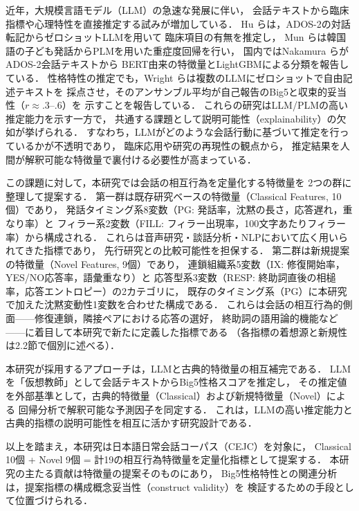 \documentclass[dvipdfmx,11pt,a4paper]{bxjsarticle}
\renewcommand{\_}{\paperorigunderscore\allowbreak}%
\begin{document}
近年，大規模言語モデル（LLM）の急速な発展に伴い，
会話テキストから臨床指標や心理特性を直接推定する試みが増加している．
Hu ら\cite{hu2025}は，ADOS-2の対話転記からゼロショットLLMを用いて
臨床項目の有無を推定し，
Mun ら\cite{mun2024}は韓国語の子ども発話からPLMを用いた重症度回帰を行い，
国内ではNakamura ら\cite{nakamura2025}がADOS-2会話テキストから
BERT由来の特徴量とLightGBMによる分類を報告している．
性格特性の推定でも，Wright ら\cite{wright2026}は複数のLLMにゼロショットで自由記述テキストを
採点させ，そのアンサンブル平均が自己報告のBig5と収束的妥当性（$r \approx .3$--$.6$）を
示すことを報告している．
これらの研究はLLM/PLMの高い推定能力を示す一方で，
共通する課題として説明可能性（explainability）の欠如が挙げられる．
すなわち，LLMがどのような会話行動に基づいて推定を行っているかが不透明であり，
臨床応用や研究の再現性の観点から，
推定結果を人間が解釈可能な特徴量で裏付ける必要性が高まっている．

この課題に対して，本研究では会話の相互行為を定量化する特徴量を
2つの群に整理して提案する．
第一群は既存研究ベースの特徴量（Classical Features, 10個）であり，
発話タイミング系8変数（PG: 発話率，沈黙の長さ，応答遅れ，重なり率）と
フィラー系2変数（FILL: フィラー出現率，100文字あたりフィラー率）から構成される．
これらは音声研究・談話分析・NLPにおいて広く用いられてきた指標であり，
先行研究との比較可能性を担保する．
第二群は新規提案の特徴量（Novel Features, 9個）であり，
連鎖組織系5変数（IX: 修復開始率，YES/NO応答率，語彙重なり）と
応答型系3変数（RESP: 終助詞直後の相槌率，応答エントロピー）の2カテゴリに，
既存のタイミング系（PG）に本研究で加えた沈黙変動性1変数を合わせた構成である．
これらは会話の相互行為的側面——修復連鎖，隣接ペアにおける応答の選好，
終助詞の語用論的機能など——に着目して本研究で新たに定義した指標である
（各指標の着想源と新規性は2.2節で個別に述べる）．

本研究が採用するアプローチは，LLMと古典的特徴量の相互補完である．
LLMを「仮想教師」として会話テキストからBig5性格スコアを推定し，
その推定値を外部基準として，古典的特徴量（Classical）および新規特徴量（Novel）による
回帰分析で解釈可能な予測因子を同定する．
これは，LLMの高い推定能力と古典的指標の説明可能性を相互に活かす研究設計である．

以上を踏まえ，本研究は日本語日常会話コーパス（CEJC）を対象に，
Classical 10個 + Novel 9個 = 計19の相互行為特徴量を定量化指標として提案する．
本研究の主たる貢献は特徴量の提案そのものにあり，
Big5性格特性との関連分析は，提案指標の構成概念妥当性（construct validity）を
検証するための手段として位置づけられる．
\end{document}
